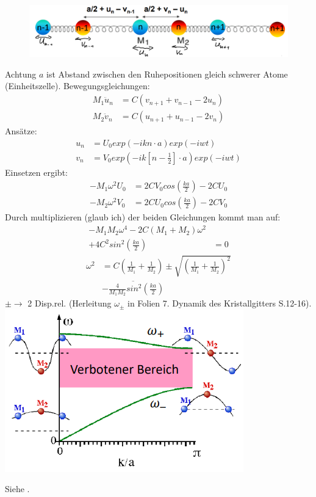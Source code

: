 \begin{minipage}[t]{0.5\textwidth}
    \centering
    \begin{figure}[H]
        \includegraphics[width=0.9\linewidth]{resources/16-03-2012/q49_diff_mass.png}
    \end{figure}
    Achtung $a$ ist Abstand zwischen den Ruhepositionen gleich schwerer Atome (Einheitszelle).
    Bewegungsgleichungen:
    \begin{align*}
        M_1 \ddot{u}_n &= C\left(v_{n+1} + v_{n-1} - 2u_n\right)\\
        M_2 \ddot{v}_n &= C\left(u_{n+1} + u_{n-1} - 2v_n\right)
    \end{align*}
    Ansätze:
    \begin{align*}
        u_n &= U_0 exp\left(-ikn\cdot a\right)exp(-iwt)\\
        v_n &= V_0 exp\left(-ik\left[n-\frac{1}{2}\right]\cdot a\right)exp(-iwt)
    \end{align*}
    Einsetzen ergibt:
    \begin{align*}
        - M_1 \omega^2 U_0 &= 2CV_0 cos \left(\frac{ka}{2}\right) - 2CU_0\\
        - M_2 \omega^2 V_0 &= 2CU_0 cos \left(\frac{ka}{2}\right) - 2CV_0
    \end{align*}
    Durch multiplizieren (glaub ich) der beiden Gleichungen kommt man auf:
    \begin{align*}
        - M_1M_2\omega^4 - 2C \left(M_1 + M_2\right) \omega^2&\\
        + 4C^2 sin^2\left(\frac{ka}{2}\right)& = 0
    \end{align*}
    \begin{align*}
        \omega^2 &= C \left(\frac{1}{M_1} + \frac{1}{M_2}\right) \pm \sqrt{\left(\frac{1}{M_1} + \frac{1}{M_2}\right)^2} \\
        &\overline{-\frac{4}{M_1 M_2}sin^2\left(\frac{ka}{2}\right)}
    \end{align*}
    $\pm \rightarrow$ 2 Disp.rel. (Herleitung $\omega_{\pm}$ in Folien 7. Dynamik des Kristallgitters S.12-16).
    \includegraphics[width=0.7\linewidth]{resources/16-03-2012/q49_diff_mass_disp.png}
\end{minipage}

\label{q:50}

Siehe .

\newpage